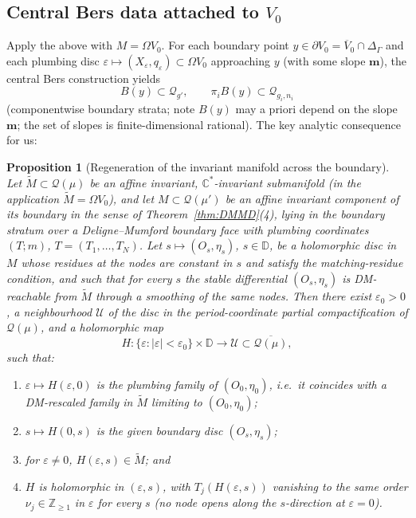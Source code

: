 \documentclass[11pt]{article}
\newcommand{\C}{\mathbb{C}}
\newcommand{\D}{\mathbb{D}}
\newcommand{\cQ}{\mathcal{Q}}
\newtheorem{prop}[thm]{Proposition}
\theoremstyle{definition}
\theoremstyle{remark}
\begin{document}
\subsection{Central Bers data attached to $V_0$}

Apply the above with $M = \Omega V_0$. For each boundary point
$y \in \partial V_0 = \overline{V}_0 \cap \Delta_\Gamma$ and each plumbing
disc $\varepsilon \mapsto (X_\varepsilon, q_\varepsilon) \subset \Omega
V_0$ approaching $y$ (with some slope $\mathbf{m}$), the central Bers
construction yields
\[
B(y) \subset \cQ_{g'}, \qquad \pi_i B(y) \subset \cQ_{g_i,n_i}
\]
(componentwise boundary strata; note $B(y)$ may a priori depend on the
slope $\mathbf{m}$; the set of slopes is finite-dimensional rational). The
key analytic consequence for us:

\begin{prop}[Regeneration of the invariant manifold across the
boundary]\label{prop:regeneration}
Let $\widetilde{M} \subset \cQ(\mu)$ be an affine invariant,
$\C^*$-invariant submanifold (in the application $\widetilde{M} = \Omega
V_0$), and let $M \subset \cQ(\mu')$ be an affine invariant component of
its boundary in the sense of Theorem~\ref{thm:DMMD}(4), lying in the
boundary stratum over a Deligne--Mumford boundary face with plumbing
coordinates $(T; m)$, $T = (T_1,\dots,T_N)$. Let
$s \mapsto (O_s,\eta_s)$, $s \in \D$, be a holomorphic disc in $M$ whose
residues at the nodes are constant in $s$ and satisfy the matching-residue
condition, and such that for every $s$ the stable differential
$(O_s,\eta_s)$ is DM-reachable from $\widetilde M$ through a smoothing of
the same nodes. Then there exist $\varepsilon_0 > 0$, a neighbourhood
$\mathcal U$ of the disc in the period-coordinate partial compactification
of $\cQ(\mu)$, and a holomorphic map
\[
H : \{\varepsilon : |\varepsilon| < \varepsilon_0\} \times \D
\longrightarrow \mathcal U \subset \overline{\cQ(\mu)},
\]
such that:
\begin{enumerate}[label=(\arabic*)]
\item $\varepsilon \mapsto H(\varepsilon, 0)$ is the plumbing family of
$(O_0,\eta_0)$, i.e.\ it coincides with a DM-rescaled family in
$\widetilde M$ limiting to $(O_0,\eta_0)$;
\item $s \mapsto H(0,s)$ is the given boundary disc $(O_s,\eta_s)$;
\item for $\varepsilon \neq 0$, $H(\varepsilon, s) \in \widetilde M$; and
\item $H$ is holomorphic in $(\varepsilon, s)$, with
$T_j(H(\varepsilon, s))$ vanishing to the \emph{same} order
$\nu_j \in \mathbb{Z}_{\ge 1}$ in $\varepsilon$ for every $s$ (no node
opens along the $s$-direction at $\varepsilon = 0$).
\end{enumerate}
\end{prop}
\end{document}
